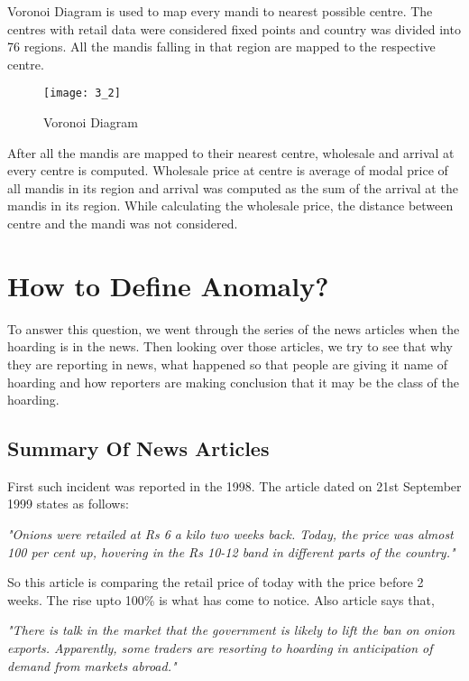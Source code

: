 Voronoi Diagram is used to map every mandi to nearest possible centre. The centres with retail data were considered fixed points and country was divided into 76 regions. All the mandis falling in that region are mapped to the respective centre.


\begin{figure}[h]
\begin{center}    
\texttt{[image: 3\_2]}
\caption{Voronoi Diagram}
\label{fig:Voronoi Diagram}
\end{center}
\end{figure}


After all the mandis are mapped to their nearest centre, wholesale and arrival at every centre is computed. Wholesale price at centre is average of modal price of all mandis in its region and arrival was computed as the sum of the arrival at the mandis in its region. While calculating the wholesale price, the distance between centre and the mandi was not considered.




\section{How to Define Anomaly?}

To answer this question, we went through the series of the news articles when the hoarding is in the news. Then looking over those articles, we try to see that why they are reporting in news, what happened so that people are giving it name of hoarding and how reporters are making conclusion that it may be the class of the hoarding.

\subsection{Summary Of News Articles}


First such incident was reported in the 1998. The article \cite{Redif57:online} dated on 21st September 1999 states as follows:

\textit{"Onions were retailed at Rs 6 a kilo two weeks back. Today, the price was almost 100 per cent up, hovering in the Rs 10-12 band in different parts of the country."}

So this article is comparing the retail price of today with the price before 2 weeks. The rise upto 100\% is what has come to notice. Also article says that,

\textit{"There is talk in the market that the government is likely to lift the ban on onion exports. Apparently, some traders are resorting to hoarding in anticipation of demand from markets abroad."}

